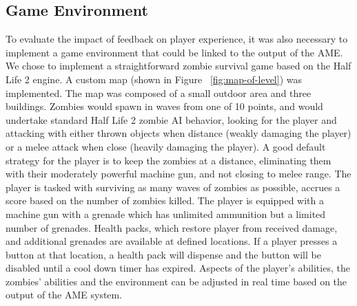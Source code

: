 \documentclass[conference]{IEEEtran}
\begin{document}

\subsection{Game Environment}
\label{game_env}
To evaluate the impact of feedback on player experience, it was also necessary to implement a game environment that could be linked to the output of the AME. We chose to implement a straightforward zombie survival game based on the Half Life 2 engine. A custom map (shown in Figure ~\ref{fig:map-of-level}) was implemented. The map was composed of a small outdoor area and three buildings. Zombies would spawn in waves from one of 10 points, and would undertake standard Half Life 2 zombie AI behavior, looking for the player and attacking with either thrown objects when distance (weakly damaging the player) or a melee attack when close (heavily damaging the player). A good default strategy for the player is to keep the zombies at a distance, eliminating them with their moderately powerful machine gun, and not closing to melee range. The player is tasked with surviving as many waves of zombies as possible, accrues a score based on the number of zombies killed. The player is equipped with a machine gun with a grenade which has unlimited ammunition but a limited number of grenades. Health packs, which restore player from received damage, and additional grenades are available at defined locations. If a player presses a button at that location, a health pack will dispense and the button will be disabled until a cool down timer has expired. Aspects of the player's abilities, the zombies' abilities and the environment can be adjusted in real time based on the output of the AME system.
\end{document}
